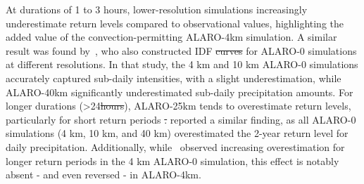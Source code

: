 \documentclass[journal abbreviation, manuscript]{copernicus}
\providecommand{\DIFadd}[1]{{\protect\color{blue}\uwave{#1}}} %
\providecommand{\DIFdel}[1]{{\protect\color{red}\sout{#1}}} %
\providecommand{\DIFaddbegin}{} %
\providecommand{\DIFaddend}{} %
\providecommand{\DIFdelbegin}{} %
\providecommand{\DIFdelend}{} %
\begin{document}
At durations of 1 to 3 hours, lower-resolution simulations increasingly underestimate return levels compared to observational values, highlighting the added value of the convection-permitting ALARO-4km simulation. 
A similar result was found by~\citet{tabari_local_2016}, who also constructed IDF \DIFdelbegin \DIFdel{curves }\DIFdelend \DIFaddbegin \DIFadd{statistics }\DIFaddend for ALARO-0 simulations at different resolutions. 
In that study, the 4 km and 10 km ALARO-0 simulations accurately captured sub-daily intensities, with a slight underestimation, while ALARO-40km significantly underestimated sub-daily precipitation amounts. 
For longer durations (>24\DIFdelbegin \DIFdel{hours}\DIFdelend \DIFaddbegin \DIFadd{\,h}\DIFaddend ), ALARO-25km tends to overestimate \DIFaddbegin \DIFadd{the }\DIFaddend return levels, particularly for short return periods \DIFdelbegin \DIFdel{. 
}\DIFdelend \DIFaddbegin \DIFadd{(Fig.~\ref{fig:IDFs_boxplots}a--c).
}\DIFaddend \citet{de_troch_application_2016} reported a similar finding, as all ALARO-0 simulations (4 km, 10 km, and 40 km) overestimated the 2-year return level for daily precipitation. 
Additionally, while~\citet{de_troch_application_2016} observed increasing overestimation for longer return periods in the 4 km ALARO-0 simulation, this effect is notably absent - and even reversed - in ALARO-4km.
\end{document}
